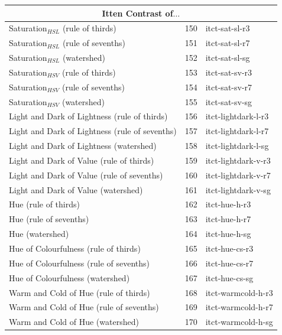 \documentclass[11pt,a4paper,twoside,openright,draft]{report}
\begin{document}
\begin{center}
\begin{longtable}{|l|c|l|}
\midrule
\multicolumn{3}{c}{Itten Contrast of$\ldots$} \\
\midrule
Saturation$_{HSL}$ (rule of thirds)              & 150 & itct-sat-sl-r3      \\
Saturation$_{HSL}$ (rule of sevenths)            & 151 & itct-sat-sl-r7      \\
Saturation$_{HSL}$ (watershed)                   & 152 & itct-sat-sl-sg      \\
Saturation$_{HSV}$ (rule of thirds)              & 153 & itct-sat-sv-r3      \\
Saturation$_{HSV}$ (rule of sevenths)            & 154 & itct-sat-sv-r7      \\
Saturation$_{HSV}$ (watershed)                   & 155 & itct-sat-sv-sg      \\
Light and Dark of Lightness (rule of thirds)     & 156 & itct-lightdark-l-r3 \\
Light and Dark of Lightness (rule of sevenths)   & 157 & itct-lightdark-l-r7 \\
Light and Dark of Lightness (watershed)          & 158 & itct-lightdark-l-sg \\
Light and Dark of Value (rule of thirds)         & 159 & itct-lightdark-v-r3 \\
Light and Dark of Value (rule of sevenths)       & 160 & itct-lightdark-v-r7 \\
Light and Dark of Value (watershed)              & 161 & itct-lightdark-v-sg \\
Hue (rule of thirds)                             & 162 & itct-hue-h-r3       \\
Hue (rule of sevenths)                           & 163 & itct-hue-h-r7       \\
Hue (watershed)                                  & 164 & itct-hue-h-sg       \\
Hue of Colourfulness (rule of thirds)            & 165 & itct-hue-cs-r3      \\
Hue of Colourfulness (rule of sevenths)          & 166 & itct-hue-cs-r7      \\
Hue of Colourfulness (watershed)                 & 167 & itct-hue-cs-sg      \\
Warm and Cold of Hue (rule of thirds)            & 168 & itct-warmcold-h-r3  \\
Warm and Cold of Hue (rule of sevenths)          & 169 & itct-warmcold-h-r7  \\
Warm and Cold of Hue (watershed)                 & 170 & itct-warmcold-h-sg  \\

\end{longtable}
\end{center}
\end{document}
